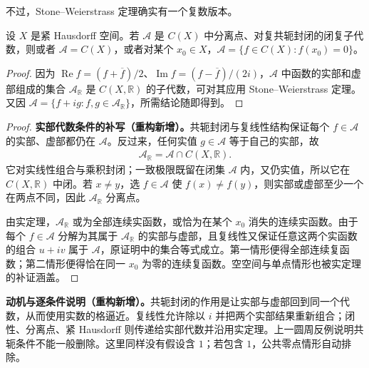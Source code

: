 \documentclass[../../main.tex]{subfiles}%
\begin{document}
不过，Stone--Weierstrass 定理确实有一个复数版本。
\begin{theorem}\label{theorem:ch04-complex-stone-weierstrass}
设 $X$ 是紧 Hausdorff 空间。若 $\mathcal A$ 是 $C(X)$ 中分离点、对复共轭封闭的闭复子代数，则或者 $\mathcal A=C(X)$，或者对某个 $x_0\in X$，$\mathcal A=\{f\in C(X):f(x_0)=0\}$。
\end{theorem}
\begin{proof}
因为 $\operatorname{Re}f=(f+\overline f)/2$、$\operatorname{Im}f=(f-\overline f)/(2i)$，$\mathcal A$ 中函数的实部和虚部组成的集合 $\mathcal A_{\mathbb R}$ 是 $C(X,\mathbb R)$ 的子代数，可对其应用 Stone--Weierstrass 定理。又因 $\mathcal A=\{f+ig:f,g\in\mathcal A_{\mathbb R}\}$，所需结论随即得到。
\end{proof}
\begin{proof}
\textbf{实部代数条件的补写（重构新增）。}共轭封闭与复线性结构保证每个 $f\in\mathcal A$ 的实部、虚部都仍在 $\mathcal A$。反过来，任何实值 $g\in\mathcal A$ 等于自己的实部，故
\begin{align*}
\mathcal A_{\mathbb R}=\mathcal A\cap C(X,\mathbb R).
\end{align*}
它对实线性组合与乘积封闭；一致极限既留在闭集 $\mathcal A$ 内，又仍实值，所以它在 $C(X,\mathbb R)$ 中闭。若 $x\ne y$，选 $f\in\mathcal A$ 使 $f(x)\ne f(y)$，则实部或虚部至少一个在两点不同，因此 $\mathcal A_{\mathbb R}$ 分离点。

由实定理，$\mathcal A_{\mathbb R}$ 或为全部连续实函数，或恰为在某个 $x_0$ 消失的连续实函数。由于每个 $f\in\mathcal A$ 分解为其属于 $\mathcal A_{\mathbb R}$ 的实部与虚部，且复线性又保证任意这两个实函数的组合 $u+iv$ 属于 $\mathcal A$，原证明中的集合等式成立。第一情形便得全部连续复函数；第二情形便得恰在同一 $x_0$ 为零的连续复函数。空空间与单点情形也被实定理的补证涵盖。
\end{proof}
\begin{remark}
\textbf{动机与逐条件说明（重构新增）。}共轭封闭的作用是让实部与虚部回到同一个代数，从而使用实数的格逼近。复线性允许除以 $i$ 并把两个实部结果重新组合；闭性、分离点、紧 Hausdorff 则传递给实部代数并沿用实定理。上一圆周反例说明共轭条件不能一般删除。这里同样没有假设含 $1$；若包含 $1$，公共零点情形自动排除。
\end{remark}
\end{document}
